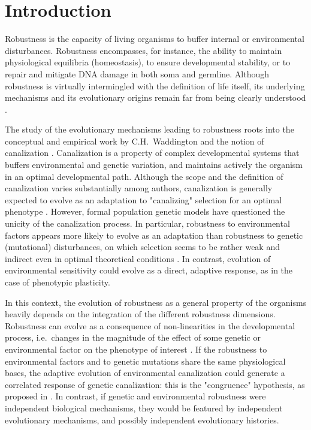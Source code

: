 \documentclass[10pt,a4paper]{article}
\begin{document}
\section{Introduction}

Robustness is the capacity of living organisms to buffer internal or environmental disturbances. Robustness encompasses, for instance, the ability to maintain physiological equilibria (homeostasis), to ensure developmental stability, or to repair and mitigate DNA damage in both soma and germline. Although robustness is virtually intermingled with the definition of life itself, its underlying mechanisms and its evolutionary origins remain far from being clearly understood \citep{Ste02,MS09,HGK+19}. 

The study of the evolutionary mechanisms leading to robustness roots into the conceptual and empirical work by C.H.\ Waddington and the notion of canalization \citep{Wad42,Wad59,Sch49}. Canalization is a property of complex developmental systems that buffers environmental and genetic variation, and maintains actively the organism in an optimal developmental path. Although the scope and the definition of canalization varies substantially among authors, canalization is generally expected to evolve as an adaptation to "canalizing" selection for an optimal phenotype \citep{EM98,DD01,Fla05,Kli19}. However, formal population genetic models have questioned the unicity of the canalization process. In particular, robustness to environmental factors appears more likely to evolve as an adaptation than robustness to genetic (mutational) disturbances, on which selection seems to be rather weak and indirect even in optimal theoretical conditions \citep{WBB97,  HHW03,LAH13}. In contrast, evolution of environmental sensitivity could evolve as a direct, adaptive response, as in the case of phenotypic plasticity. 

In this context, the evolution of robustness as a general property of the organisms heavily depends on the integration of the different robustness dimensions. Robustness can evolve as a consequence of non-linearities in the developmental process, i.e.\ changes in the magnitude of the effect of some genetic or environmental factor on the phenotype of interest \citep{Nij02}. If the robustness to environmental factors and to genetic mutations share the same physiological bases, the adaptive evolution of environmental canalization could generate a correlated response of genetic canalization: this is the "congruence" hypothesis, as proposed in \citep{dHW+03}. In contrast, if genetic and environmental robustness were independent biological mechanisms, they would be featured by independent evolutionary mechanisms, and possibly independent evolutionary histories. 
\end{document}
